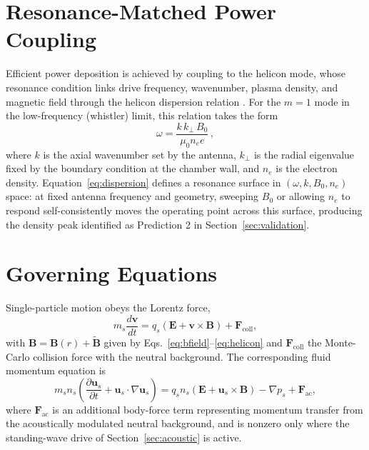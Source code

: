 \documentclass[11pt]{article}
\begin{document}
\section{Resonance-Matched Power Coupling}

Efficient power deposition is achieved by coupling to the helicon mode, whose resonance condition links drive frequency, wavenumber, plasma density, and magnetic field through the helicon dispersion relation \cite{chenarnush1997,boswell1984,chen2015}. For the $m=1$ mode in the low-frequency (whistler) limit, this relation takes the form
\begin{equation}
\omega = \frac{k\, k_\perp\, B_0}{\mu_0 n_e e}\,,
\label{eq:dispersion}
\end{equation}
where $k$ is the axial wavenumber set by the antenna, $k_\perp$ is the radial eigenvalue fixed by the boundary condition at the chamber wall, and $n_e$ is the electron density. Equation~\eqref{eq:dispersion} defines a resonance surface in $(\omega, k, B_0, n_e)$ space: at fixed antenna frequency and geometry, sweeping $B_0$ or allowing $n_e$ to respond self-consistently moves the operating point across this surface, producing the density peak identified as Prediction 2 in Section~\ref{sec:validation}.

\section{Governing Equations}

Single-particle motion obeys the Lorentz force,
\begin{equation}
m_s \frac{d\mathbf{v}}{dt} = q_s\left(\mathbf{E} + \mathbf{v}\times\mathbf{B}\right) + \mathbf{F}_{\mathrm{coll}},
\label{eq:lorentz}
\end{equation}
with $\mathbf{B} = \mathbf{B}(r) + \tilde{\mathbf{B}}$ given by Eqs.~\eqref{eq:bfield}--\eqref{eq:helicon} and $\mathbf{F}_{\mathrm{coll}}$ the Monte-Carlo collision force with the neutral background. The corresponding fluid momentum equation is
\begin{equation}
m_s n_s \left(\frac{\partial \mathbf{u}_s}{\partial t} + \mathbf{u}_s\cdot\nabla \mathbf{u}_s\right) = q_s n_s\left(\mathbf{E} + \mathbf{u}_s\times\mathbf{B}\right) - \nabla p_s + \mathbf{F}_{\mathrm{ac}},
\label{eq:fluid}
\end{equation}
where $\mathbf{F}_{\mathrm{ac}}$ is an additional body-force term representing momentum transfer from the acoustically modulated neutral background, and is nonzero only where the standing-wave drive of Section~\ref{sec:acoustic} is active.
\end{document}
